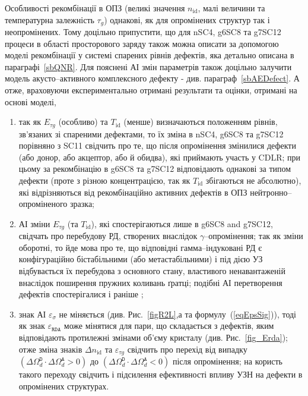 Особливості рекомбінації в ОПЗ (великі значення $n_\mathrm{id}$, малі величини та температурна залежність $\tau_g$)
однакові, як  для опромінених структур так і неопромінених.
Тому доцільно припустити, що для nSC4, g6SC8 та g7SC12 процеси в області просторового заряду також можна описати
за допомогою моделі рекомбінації у системі спарених рівнів дефектів, яка детально описана в параграфі~\ref{sbQNR}.
Для пояснені АІ змін параметрів також доцільно залучити модель акусто--активного комплексного дефекту - див. параграф~\ref{sbAEDefect}.
А отже, враховуючи експериментально отримані результати та оцінки, отримані на основі моделі,
\begin{enumerate}[label=\asbuk*),leftmargin=0em,itemindent=1.5em]
\item так як $E_{\tau g}$ (особливо) та $T_{\mathrm{id}}$ (менше) визначаються положенням рівнів, зв'язаних
зі спареними дефектами, то їх зміна в nSC4, g6SC8 та g7SC12 порівняно з SC11 свідчить про те, що
після опромінення змінилися дефекти (або донор, або акцептор, або й обидва), які приймають участь у CDLR;
при цьому за рекомбінацію в g6SC8 та g7SC12 відповідають однакові за типом дефекти (проте з різною концентрацією,
 так як $T_{\mathrm{id}}$ збігаються не абсолютно), які відрізняються від рекомбінаційно активних дефектів в ОПЗ нейтронно--опроміненого зразка;

\item  АІ зміни   $E_{\tau g}$ (та $T_{\mathrm{id}}$), які спостерігаються лише в g6SC8 and g7SC12,
 свідчать про перебудову РД, створених внаслідок $\gamma$--опромінення;
 так як зміни оборотні, то йде мова про те, що відповідні
 гамма--індуковані РД є конфігураційно бістабільними (або метастабільними) і під дією УЗ відбувається їх перебудова з основного стану,
 властивого ненавантаженій внаслідок поширення пружних коливань ґратці;
 подібні АІ перетворення дефектів спостерігалися і раніше \cite{Wosinski,Ostapenko1994,YOlikhTPL2011r};

 \item знак АІ $\varepsilon_{\sigma}$ не міняється (див. Рис.~\ref{figR2L},а та формулу~(\ref{eqEpsSig})), тоді як
  знак  $\varepsilon_{\mathtt{RDA}}$  може мінятися для пари, що складається з дефектів, яким відповідають протилежні
  змінами об'єму кристалу (див. Рис.~\ref{fig_Erda});
  отже зміна знаків $\Delta n_{\mathrm{id}}$ та $\varepsilon_{\tau g}$ свідчить про перехід від випадку
  $(\Delta\Omega_d^\mathtt{D}\cdot\Delta\Omega_d^\mathtt{A}>0)$ до
  $(\Delta\Omega_d^\mathtt{D}\cdot\Delta\Omega_d^\mathtt{A}<0)$ після опромінення;
  на користь такого переходу свідчить і підсилення ефективності впливу УЗН на дефекти в опромінених структурах.
\end{enumerate}

